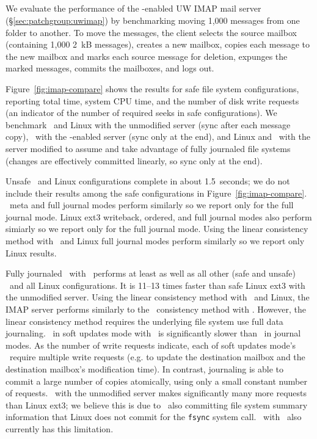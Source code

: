 \subsection {\Patchgroups}
\label{sec:evaluation:uwimap}


We evaluate the performance of the \patchgroup-enabled UW IMAP mail
server (\S\ref{sec:patchgroup:uwimap}) by benchmarking moving 1,000
messages from one folder to another.
%
To move the messages, the client selects the source mailbox (containing
1,000 2~kB messages), creates a new mailbox, copies each message to
the new mailbox and marks each source message for deletion, expunges
the marked messages, commits the mailboxes, and logs out.

Figure~\ref{fig:imap-compare} shows the results for safe file system
configurations,
%
reporting total time, system CPU time, and the number of disk write
requests (an indicator of the number of required seeks in safe
configurations).
%
We benchmark
%
\Kudos\ and Linux with the unmodified server (sync after each message
copy),
%
\Kudos\ with the \patchgroup-enabled server (sync only at the end),
%
and Linux and \Kudos\ with the server modified to assume and take
advantage of fully journaled file systems (changes are effectively
committed linearly, so sync only at the end).

Unsafe \Kudos\ and Linux configurations complete in about 1.5~seconds;
we do not include their results among the safe configurations in
Figure~\ref{fig:imap-compare}.
%
\Kudos\ meta and full journal modes perform similarly so we report
only for the full journal mode.
%
Linux ext3 writeback, ordered, and full journal modes also perform simiarly
so we report only for the full journal mode.
%
Using the linear consistency method with \Kudos\ and Linux full
journal modes perform similarly so we report only Linux results.

Fully journaled \Kudos\ with \patchgroups\ performs at least as well
as all other (safe and unsafe) \Kudos\ and all Linux configurations.
It is 11--13 times faster than safe Linux ext3 with the unmodified
server.
%
Using the linear consistency method with \Kudos\ and Linux, the IMAP
server performs similarly to the \patchgroup\ consistency method with
\Kudos. However, the linear consistency method requires the underlying
file system use full data journaling.
%
\Kudos\ in soft updates mode with \patchgroups\ is significantly
slower than \Kudos\ in journal modes. As the number of write requests
indicate, each of soft updates mode's \patchgroups\ require multiple
write requests (e.g. to update the destination mailbox and the
destination mailbox's modification time). In contrast, journaling is
able to commit a large number of copies atomically, using only a small
constant number of requests.
%
\Kudos\ with the unmodified server makes significantly many more
requests than Linux ext3; we believe this is due to \Kudos\ also
committing file system summary information that Linux does not commit
for the \texttt{fsync} system call. \Kudos\ with \patchgroups\
also currently has this limitation.

